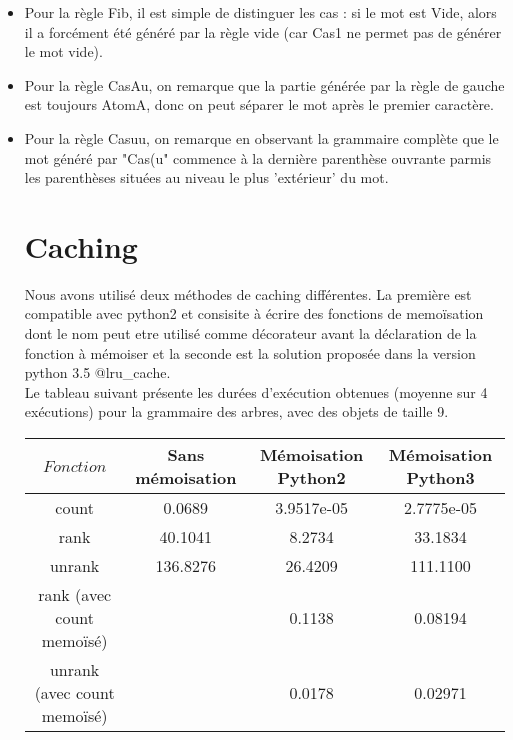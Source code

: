 \documentclass[a4paper, titlepage]{article}
\begin{document}
\begin{itemize}
\item Pour la règle Fib, il est simple de distinguer les cas : si le mot est
Vide, alors il a forcément été généré par la règle vide (car Cas1 ne
permet pas de générer le mot vide).\\
\item Pour la règle CasAu, on remarque que la partie générée par la règle de
gauche est toujours AtomA, donc on peut séparer le mot après le
premier caractère.\\
\item Pour la règle Casuu, on remarque en observant la grammaire complète
que le mot généré par "Cas(u" commence à la dernière parenthèse
ouvrante parmis les parenthèses situées au niveau le plus 'extérieur'
du mot.\\

\section{Caching}

Nous avons utilisé deux méthodes de caching différentes.
La première est compatible avec python2 et consisite à écrire des
fonctions de memoïsation dont le nom peut etre utilisé comme
décorateur avant la déclaration de la fonction à mémoiser et la
seconde est la solution proposée dans la version python 3.5
@lru\_cache.\\

Le tableau suivant présente les durées d'exécution obtenues (moyenne
sur 4 exécutions) pour la grammaire des arbres, avec des objets de taille 9.

\begin{table}[!hbt]
\centering
\small
\setlength\tabcolsep{2pt}
\begin{tabular}{|c||c|c|c|}
\hline $Fonction$ & Sans mémoisation & Mémoisation Python2 &  Mémoisation Python3\\
\hline
\hline

count & 0.0689 & 3.9517e-05 &  2.7775e-05\\
rank & 40.1041 & 8.2734 & 33.1834 \\
unrank & 136.8276 & 26.4209 & 111.1100\\
rank (avec count memoïsé) & \cellcolor{gray} & 0.1138 & 0.08194\\
unrank (avec count memoïsé) & \cellcolor{gray} & 0.0178 & 0.02971\\
\hline
\end{tabular}
\end{table}


\end{itemize}
\end{document}
